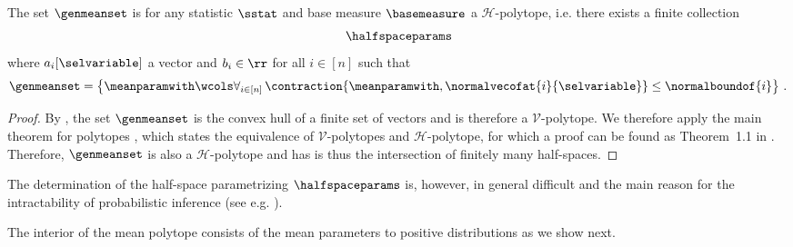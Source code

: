 \begin{theorem}
    \label{the:meanPolytopeHalfspaces}
    The set $\genmeanset$ is for any statistic $\sstat$ and base measure $\basemeasure$ a $\mathcal{H}$-polytope, i.e. there exists a finite collection
    \begin{align*}
        \halfspaceparams
    \end{align*}
    where $a_i[\selvariable]$ a vector and $b_i\in\rr$ for all $i\in[n]$ such that
    \begin{align*}
        \genmeanset
        = \left\{\meanparamwith \wcols\forall_{i\in[n]} \, \contraction{\meanparamwith,\normalvecofat{i}{\selvariable}}\leq\normalboundof{i} \right\} \, .
    \end{align*}
\end{theorem}
\begin{proof}
    By , the set $\genmeanset$ is the convex hull of a finite set of vectors and is therefore a $\mathcal{V}$-polytope.
    We therefore apply the main theorem for polytopes \cite{motzkin_beitrage_1936}, which states the equivalence of $\mathcal{V}$-polytopes and $\mathcal{H}$-polytope, for which a proof can be found as Theorem~1.1 in \cite{ziegler_lectures_2013}.
    Therefore, $\genmeanset$ is also a $\mathcal{H}$-polytope and has is thus the intersection of finitely many half-spaces.
\end{proof}

The determination of the half-space parametrizing $\halfspaceparams$ is, however, in general difficult and the main reason for the intractability of probabilistic inference (see e.g. \cite{wainwright_graphical_2008}).



The interior of the mean polytope consists of the mean parameters to positive distributions as we show next.

